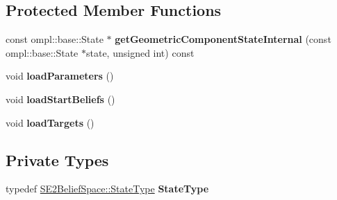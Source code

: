 \subsection*{Protected Member Functions}
\begin{DoxyCompactItemize}
\item 
\hypertarget{class_multi_modal_setup_accd46e9b7a14bac38eabda3f55ae93e5}{const ompl\-::base\-::\-State $\ast$ {\bfseries get\-Geometric\-Component\-State\-Internal} (const ompl\-::base\-::\-State $\ast$state, unsigned int) const }\label{class_multi_modal_setup_accd46e9b7a14bac38eabda3f55ae93e5}

\item 
\hypertarget{class_multi_modal_setup_abf9f48b90d4904ede7728c6150e006f1}{void {\bfseries load\-Parameters} ()}\label{class_multi_modal_setup_abf9f48b90d4904ede7728c6150e006f1}

\item 
\hypertarget{class_multi_modal_setup_a39c4b973fe763fdf0dda1c42e82f9257}{void {\bfseries load\-Start\-Beliefs} ()}\label{class_multi_modal_setup_a39c4b973fe763fdf0dda1c42e82f9257}

\item 
\hypertarget{class_multi_modal_setup_a1af3a34958f6ff4ff7a723af8d00f9f7}{void {\bfseries load\-Targets} ()}\label{class_multi_modal_setup_a1af3a34958f6ff4ff7a723af8d00f9f7}

\end{DoxyCompactItemize}
\subsection*{Private Types}
\begin{DoxyCompactItemize}
\item 
\hypertarget{class_multi_modal_setup_a205453239cc141f3735a159e1f1c5f61}{typedef \hyperlink{class_s_e2_belief_space_1_1_state_type}{S\-E2\-Belief\-Space\-::\-State\-Type} {\bfseries State\-Type}}\label{class_multi_modal_setup_a205453239cc141f3735a159e1f1c5f61}

\end{DoxyCompactItemize}
